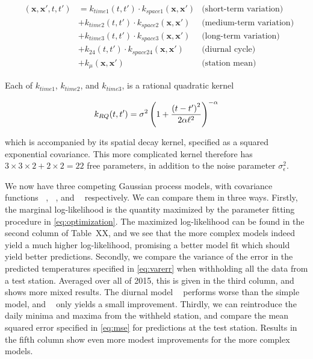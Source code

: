 \documentclass[letter]{article}
\newcommand{\genericdel}[3]{%
      \left#1#3\right#2
    }
\newcommand{\del}[1]{\genericdel(){#1}}
\newcommand{\xvec}{\mathbold{x}}
\newcommand{\sigman}{\sigma_{\epsilon}}
\DeclareMathOperator{\kSESE}{k_{\mathtt{SExSE}}}
\DeclareMathOperator{\kdiurn}{k_{\mathtt{SESE_24}}}
\DeclareMathOperator{\ksumprod}{k_{\mathtt{sumprod}}}
\newcommand{\eqlabel}[1]{\label{#1}}
\begin{document}
\begin{equation}
\eqlabel{eq:sumprod_kernel}
\begin{aligned}
    \ksumprod(\xvec,\xvec',t,t') &= 
           k_{time1}(t,t') \cdot k_{space1}(\xvec, \xvec')  &\text{(short-term variation)} \\
        &+ k_{time2}(t,t') \cdot k_{space2}(\xvec, \xvec')  &\text{(medium-term variation)} \\
        &+ k_{time3}(t,t') \cdot k_{space3}(\xvec, \xvec')  &\text{(long-term variation)} \\
        &+ k_{24}(t,t') \cdot k_{space24}(\xvec, \xvec') &\text{(diurnal cycle)} \\
        &+ k_\mu(\xvec, \xvec') &\text{(station mean)}
\end{aligned}
\end{equation}

Each of \(k_{time1}\), \(k_{time2}\), and \(k_{time3}\), is a rational quadratic kernel

\begin{equation}
    k_{RQ}(t,t') = \sigma^2 \del{1 + \frac{\del{t-t'}^2}{2\alpha\ell^2} }^{-\alpha}
\end{equation}

which is accompanied by its spatial decay kernel, specified as a squared exponential covariance.
This more complicated kernel therefore has \(3 \times 3 \times 2 + 2 \times 2 = 22\) free parameters, in addition to the noise parameter \(\sigman^2\).

We now have three competing Gaussian process models, with covariance functions \(\kSESE\), \(\kdiurn\), and \(\ksumprod\) respectively. We can compare them in three ways. Firstly, the marginal log-likelihood is the quantity maximized by the parameter fitting procedure in \eqref{eq:optimization}. The maximized log-likelihood can be found in the second column of Table~XX, and we see that the more complex models indeed yield a much higher log-likelihood, promising a better model fit which should yield better predictions. Secondly, we compare the variance of the error in the predicted temperatures specified in \eqref{eq:varerr} when withholding all the data from a test station. Averaged over all of 2015, this is given in the third column, and shows more mixed results. The diurnal model \(\kdiurn\) performs worse than the simple \(\kSESE\) model, and \(\ksumprod\) only yields a small improvement.
Thirdly, we can reintroduce the daily minima and maxima from the withheld station, and compare the mean squared error specified in \eqref{eq:mse} for predictions at the test station. Results in the fifth column show even more modest improvements for the more complex models.
\end{document}
